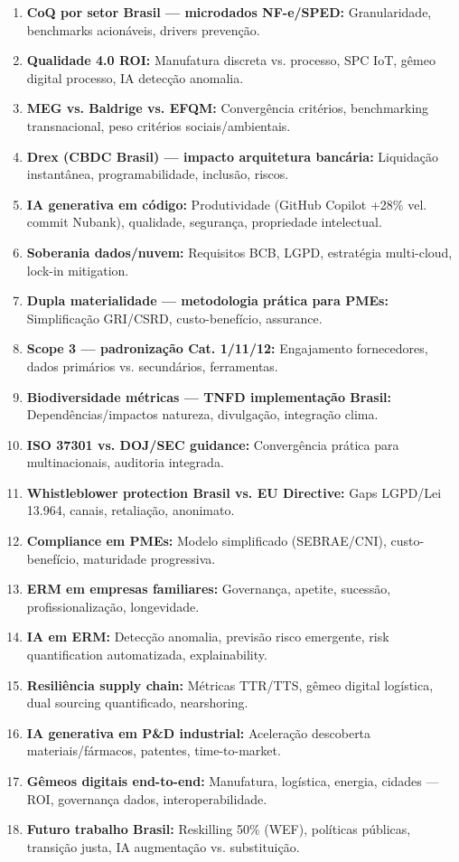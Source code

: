 \begin{enumerate}
    \item \textbf{CoQ por setor Brasil — microdados NF-e/SPED:} Granularidade, benchmarks acionáveis, drivers prevenção.
    \item \textbf{Qualidade 4.0 ROI:} Manufatura discreta vs. processo, SPC IoT, gêmeo digital processo, IA detecção anomalia.
    \item \textbf{MEG vs. Baldrige vs. EFQM:} Convergência critérios, benchmarking transnacional, peso critérios sociais/ambientais.
    \item \textbf{Drex (CBDC Brasil) — impacto arquitetura bancária:} Liquidação instantânea, programabilidade, inclusão, riscos.
    \item \textbf{IA generativa em código:} Produtividade (GitHub Copilot +28\% vel. commit Nubank), qualidade, segurança, propriedade intelectual.
    \item \textbf{Soberania dados/nuvem:} Requisitos BCB, LGPD, estratégia multi-cloud, lock-in mitigation.
    \item \textbf{Dupla materialidade — metodologia prática para PMEs:} Simplificação GRI/CSRD, custo-benefício, assurance.
    \item \textbf{Scope 3 — padronização Cat. 1/11/12:} Engajamento fornecedores, dados primários vs. secundários, ferramentas.
    \item \textbf{Biodiversidade métricas — TNFD implementação Brasil:} Dependências/impactos natureza, divulgação, integração clima.
    \item \textbf{ISO 37301 vs. DOJ/SEC guidance:} Convergência prática para multinacionais, auditoria integrada.
    \item \textbf{Whistleblower protection Brasil vs. EU Directive:} Gaps LGPD/Lei 13.964, canais, retaliação, anonimato.
    \item \textbf{Compliance em PMEs:} Modelo simplificado (SEBRAE/CNI), custo-benefício, maturidade progressiva.
    \item \textbf{ERM em empresas familiares:} Governança, apetite, sucessão, profissionalização, longevidade.
    \item \textbf{IA em ERM:} Detecção anomalia, previsão risco emergente, risk quantification automatizada, explainability.
    \item \textbf{Resiliência supply chain:} Métricas TTR/TTS, gêmeo digital logística, dual sourcing quantificado, nearshoring.
    \item \textbf{IA generativa em P\&D industrial:} Aceleração descoberta materiais/fármacos, patentes, time-to-market.
    \item \textbf{Gêmeos digitais end-to-end:} Manufatura, logística, energia, cidades — ROI, governança dados, interoperabilidade.
    \item \textbf{Futuro trabalho Brasil:} Reskilling 50\% (WEF), políticas públicas, transição justa, IA augmentação vs. substituição.
\end{enumerate}

